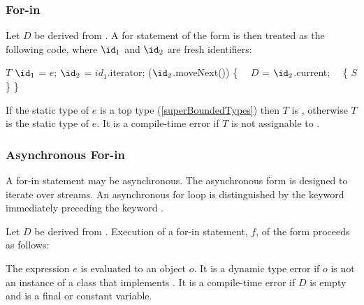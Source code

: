 \documentclass[makeidx]{article}
\begin{document}
{%



\subsubsection{For-in}

\LMHash{}%
Let $D$ be derived from .
A for statement of the form 
is then treated as the following code,
where $\id_1$ and $\id_2$ are fresh identifiers:

\begin{normativeDartCode}
$T$ $\id_1$ = $e$;
\VAR{} $\id_2$ = $id_1$.iterator;
\WHILE{} ($\id_2$.moveNext()) \{
\ \ $D$ \id{} = $\id_2$.current;
\ \ \{ $S$ \}
\}
\end{normativeDartCode}

\LMHash{}%
If the static type of $e$ is a top type
(\ref{superBoundedTypes})
then $T$ is ,
otherwise $T$ is the static type of $e$.
It is a compile-time error if $T$ is not assignable to
.



\subsubsection{Asynchronous For-in}

\LMHash{}%
A for-in statement may be asynchronous.
The asynchronous form is designed to iterate over streams.
An asynchronous for loop is distinguished by
the keyword \AWAIT{} immediately preceding the keyword \FOR.

\LMHash{}%
Let $D$ be derived from .
Execution of a for-in statement, $f$, of the form
proceeds as follows:

\LMHash{}%
The expression $e$ is evaluated to an object $o$.
It is a dynamic type error if $o$ is not an instance of
a class that implements .
It is a compile-time error if $D$ is empty
and \id{} is a final or constant variable.

}
\end{document}
